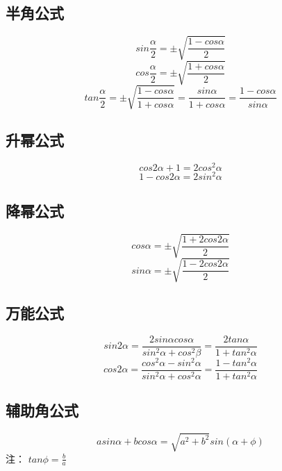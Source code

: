 \subsection{半角公式}
\begin{equation}
sin\frac{\alpha}{2} = \pm\sqrt{\frac{1-cos\alpha}{2}}
\end{equation}
\begin{equation}
cos\frac{\alpha}{2}= \pm\sqrt{\frac{1+cos\alpha}{2}}
\end{equation}
\begin{equation}
tan\frac{\alpha}{2} = \pm\sqrt{\frac{1-cos\alpha}{1+cos\alpha}} = \frac{sin\alpha}{1+cos\alpha} = \frac{1-cos\alpha}{sin\alpha}
\end{equation}

\subsection{升幂公式}
\begin{equation}
cos2\alpha + 1 = 2cos^2\alpha
\end{equation}
\begin{equation}
1-cos2\alpha = 2sin^2\alpha
\end{equation}

\subsection{降幂公式}
\begin{equation}
cos\alpha = \pm\sqrt{\frac{1+2cos2\alpha}{2}}
\end{equation}
\begin{equation}
sin\alpha = \pm\sqrt{\frac{1-2cos2\alpha}{2}}
\end{equation}

\subsection{万能公式}
\begin{equation}
sin2\alpha = \frac{2sin\alpha cos\alpha}{sin^2\alpha + cos^2\beta} = \frac{2tan\alpha}{1+tan^2\alpha}
\end{equation}
\begin{equation}
cos2\alpha = \frac{cos^2\alpha-sin^2\alpha}{sin^2\alpha+cos^2\alpha} = \frac{1-tan^2\alpha}{1+tan^2\alpha}
\end{equation}

\subsection{辅助角公式}
\begin{equation}
asin\alpha + bcos\alpha = \sqrt{a^2+b^2}sin(\alpha + \phi)
\end{equation}
注： $tan\phi = \frac{b}{a}$